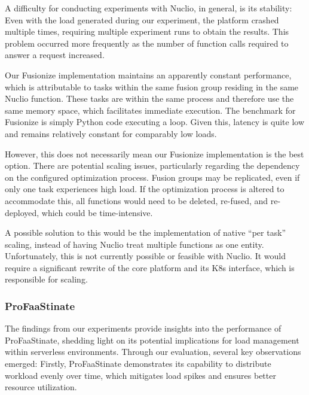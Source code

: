 A difficulty for conducting experiments with Nuclio, in general, is its stability: Even with the load generated during our experiment, the platform crashed multiple times, requiring multiple experiment runs to obtain the results.
This problem occurred more frequently as the number of function calls required to answer a request increased.

Our Fusionize implementation maintains an apparently constant performance, which is attributable to tasks within the same fusion group residing in the same Nuclio function. 
These tasks are within the same process and therefore use the same memory space, which facilitates immediate execution. 
The benchmark for Fusionize is simply Python code executing a loop. 
Given this, latency is quite low and remains relatively constant for comparably low loads.

However, this does not necessarily mean our Fusionize implementation is the best option. 
There are potential scaling issues, particularly regarding the dependency on the configured optimization process. 
Fusion groups may be replicated, even if only one task experiences high load. 
If the optimization process is altered to accommodate this, all functions would need to be deleted, re-fused, and re-deployed, which could be time-intensive.

A possible solution to this would be the implementation of native \enquote{per task} scaling, instead of having Nuclio treat multiple functions as one entity. 
Unfortunately, this is not currently possible or feasible with Nuclio. 
It would require a significant rewrite of the core platform and its K8s interface, which is responsible for scaling.

\subsubsection{ProFaaStinate}

 
The findings from our experiments provide insights into the performance of ProFaaStinate, shedding light on its potential implications for load management within serverless environments.
Through our evaluation, several key observations emerged: Firstly, ProFaaStinate demonstrates its capability to distribute workload evenly over time, which mitigates load spikes and ensures better resource utilization.


